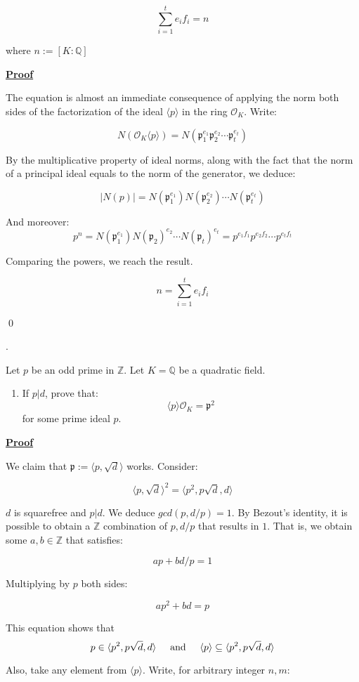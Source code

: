\documentclass{article}
\def\ZZ{{\mathbb{Z}}}
\newcounter{problemcnt}
\newcommand{\Problem}{{
    \vspace{5mm}
    \stepcounter{problemcnt}
    \noindent
    \arabic{problemcnt}. 
}
}
\newcommand{\Proof}{{
    \vspace{2mm}
    \noindent
    \textbf{
    \underline{Proof}}
}
}
\newcommand{\textAnd}{
    \hspace{5mm}
    \textrm{and}
    \hspace{5mm}
}
\newcommand{\<}{{{
    \langle
}}}
\def\>{{{
    \rangle
}}}
\def\ZZ{{\mathbb{Z}}}
\newcommand{\ringInt}{
    {\mathcal{O}}
}
\newcommand{\pideal}{
    {{\mathfrak{p}}}
}
\begin{document}
\[
    \sum_{i = 1}^t e_i f_i = n
\]

where $n:= [K:\mathbb{Q}]$

\Proof

The equation is almost an immediate consequence of applying 
the norm both sides of the factorization of the ideal 
$\<p\>$ in the ring $\ringInt_K$. Write:

\[
    N(\ringInt_K\<p\>) = N(\pideal_1^{e_1} 
    \pideal_2 ^ {e_2}
    \cdots
    \pideal_t ^{e_t})
\]

By the multiplicative property of ideal norms, along with the 
fact that the norm of a principal ideal equals to the norm 
of the generator, we deduce:

\[
    |N(p)| = N(\pideal_1^{e_1})
    N(\pideal_2^{e_2}) \cdots 
    N(\pideal_t^{e_t})
\]

And moreover:
\[
    p^n = N(\pideal_1^{e_1})
    N(\pideal_2)^{e_2} \cdots 
    N(\pideal_t)^{e_t}
    =p^{e_1 f_1}p^{e_2 f_2} \cdots p^{e_t f_t}
\]

Comparing the powers, we reach the result. 

\[
    n = \sum_{i = 1}^{t} e_if_i
\]

\qed


\newpage

\Problem
Let $p$ be an odd prime in $\ZZ$. Let $K = \mathbb{Q}$ 
be a quadratic field. 

\begin{enumerate}[i]
    \item If $p|d$, prove that:
    \[
        \<p\>\ringInt_K = \pideal^2
    \]
    for some prime ideal $p$. 
\end{enumerate}


\Proof
    We claim that $\pideal := \<p, \sqrt{d}\>$ works. 
Consider:

\[
    \<p, \sqrt{d}\>^2 = \<p^2, p\sqrt{d}, d\>
\]

$d$ is squarefree and $p|d$. We deduce $gcd(p, d/p) = 1$. 
By Bezout's identity, it is possible to obtain a 
$\ZZ$ combination of $p, d/p$ that results in $1$. That is, 
we obtain some $a, b \in \ZZ$ that satisfies:

\[
    ap+bd/p = 1
\]

Multiplying by $p$ both sides:

\[
    ap^2+bd = p
\]

This equation shows that 
\[
    p \in \<p^2, p\sqrt{d}, d\> \textAnd \<p\> \subseteq \<p^2, p\sqrt{d}, d\>
\]

Also, take any element from $\<p\>$. Write, for arbitrary integer $n, m$:
\end{document}
